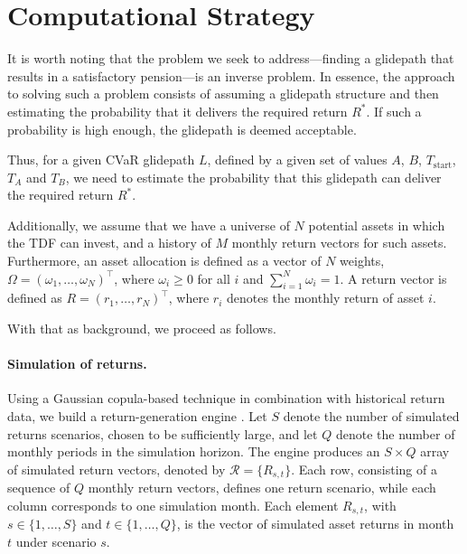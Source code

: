 \documentclass[11pt]{article}
\newcommand{\Rstar}{R^{*}}
\newcommand{\Tstart}{T_{\mathrm{start}}}
\newcommand{\TA}{T_{A}}
\newcommand{\TB}{T_{B}}
\begin{document}
\section{Computational Strategy}
It is worth noting that the problem we seek to address---finding a 
glidepath that results in a satisfactory pension---is an inverse problem. 
In essence, the approach to solving such a problem consists of assuming a glidepath structure 
and then estimating the probability that it delivers the required 
return $R^*$.  If such a probability is high enough, the glidepath is deemed acceptable.


Thus, for a given CVaR glidepath $L$, defined by a given set of values $A$, $B$, $\Tstart$, $\TA$ and $\TB$, we need to estimate the probability that this glidepath can deliver the required return $\Rstar$.

Additionally, we assume that we have a universe of $N$ potential assets in which the TDF can invest, and a history of $M$ monthly return vectors for such assets. Furthermore, an asset allocation is defined as a vector of $N$ weights, $\Omega = (\omega_{1},\ldots,\omega_{N})^{\top}$, where $\omega_{i} \geq 0$ for all $i$ and $\sum_{i=1}^{N}\omega_{i} = 1$. A return vector is defined as $R = (r_{1},\ldots,r_{N})^{\top}$, where $r_i$ denotes the monthly return of asset $i$.

With that as background, we proceed as follows.

\paragraph{Simulation of returns.}
Using a Gaussian copula-based technique in combination with historical return data, we build a return-generation engine \cite{nelsen2006}. Let $S$ denote the number of simulated returns scenarios, chosen to be sufficiently large, and let $Q$ denote the number of monthly periods in the simulation horizon. The engine produces an $S \times Q$ array of simulated return vectors, denoted by $\mathcal{R}=\{R_{s,t}\}$. Each row, consisting of a sequence of $Q$ monthly return vectors, defines one return scenario, while each column corresponds to one simulation month. Each element $R_{s,t}$, with $s \in \{1,\ldots,S\}$ and $t \in \{1,\ldots,Q\}$, is the vector of simulated asset returns in month $t$ under scenario $s$.
\end{document}
